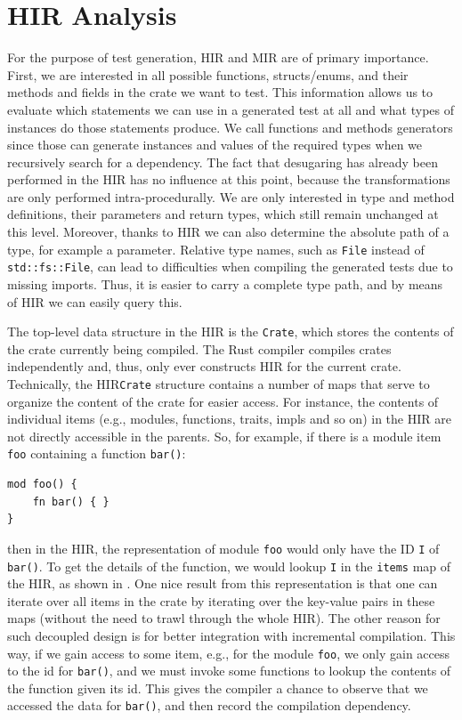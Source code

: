 \documentclass[paper=a4,%
  twoside,%
  BCOR4mm,%
  abstract=true,%
  toc=bibliography,%
  chapterprefix=true,%
  toc=bibliographynumbered,%
  open=right,%
  english,%
  pagesize=pdftex]{scrreprt}
\newcommand{\hir}{\ac{HIR}\xspace}
\newcommand{\mir}{\ac{MIR}\xspace}
\begin{document}
\section{HIR Analysis}
For the purpose of test generation, \hir and \mir are of primary importance. First, we are interested in all possible functions, structs/enums, and their methods and fields in the crate we want to test. This information allows us to evaluate which statements we can use in a generated test at all and what types of instances do those statements produce. We call functions and methods generators since those can generate instances and values of the required types when we recursively search for a dependency. The fact that desugaring has already been performed in the \hir has no influence at this point, because the transformations are only performed intra-procedurally. We are only interested in type and method definitions, their parameters and return types, which still remain unchanged at this level. Moreover, thanks to \hir we can also determine the absolute path of a type, for example a parameter. Relative type names, such as \texttt{File} instead of \texttt{std::fs::File}, can lead to difficulties when compiling the generated tests due to missing imports. Thus, it is easier to carry a complete type path, and by means of \hir we can easily query this.

The top-level data structure in the \hir is the \texttt{Crate}, which stores the contents of the crate currently being compiled. The Rust compiler compiles crates independently and, thus, only ever constructs \hir for the current crate. Technically, the \hir \texttt{Crate} structure contains a number of maps that serve to organize the content of the crate for easier access. For instance, the contents of individual items (e.g., modules, functions, traits, impls and so on) in the \hir are not directly accessible in the parents. So, for example, if there is a module item \texttt{foo} containing a function \texttt{bar()}:

\begin{lstlisting}[style=boxed, caption={}]
mod foo() {
    fn bar() { }
}
\end{lstlisting}
then in the \hir, the representation of module \texttt{foo} would only have the ID \texttt{I} of \texttt{bar()}. To get the details of the function, we would lookup \texttt{I} in the \texttt{items} map of the \hir, as shown in . One nice result from this representation is that one can iterate over all items in the crate by iterating over the key-value pairs in these maps (without the need to trawl through the whole \hir). The other reason for such decoupled design is for better integration with incremental compilation. This way, if we gain access to some item, e.g., for the module \texttt{foo}, we only gain access to the id for \texttt{bar()}, and we must invoke some functions to lookup the contents of the function given its id. This gives the compiler a chance to observe that we accessed the data for \texttt{bar()}, and then record the compilation dependency.
\end{document}
